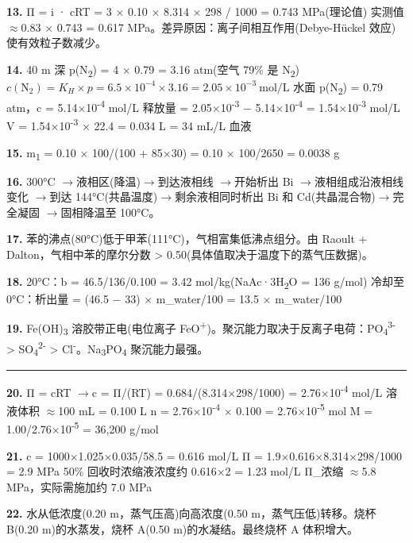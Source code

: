 \documentclass[a4paper,11pt]{ctexart}
\newcommand{\箭}{\ensuremath{\rightarrow}}
\newcommand{\左箭}{\ensuremath{\leftarrow}}
\newcommand{\上箭}{\ensuremath{\uparrow}}
\newcommand{\下箭}{\ensuremath{\downarrow}}
\newcommand{\衡}{\ensuremath{\rightleftharpoons}}
\newcommand{\双箭}{\ensuremath{\leftrightarrow}}
\newcommand{\约等于}{\ensuremath{\approx}}
\newcommand{\小于等于}{\ensuremath{\leq}}
\newcommand{\大于等于}{\ensuremath{\geq}}
\newcommand{\不等于}{\ensuremath{\neq}}
\newcommand{\西格马}{\ensuremath{\sigma}}
\newcommand{\派}{\ensuremath{\pi}}
\begin{document}
\textbf{13.} Π = i · cRT = 3 × 0.10 × 8.314 × 298 / 1000 = 0.743 MPa(理论值)
实测值 \约等于 0.83 × 0.743 = 0.617 MPa。差异原因：离子间相互作用(Debye-Hückel 效应)使有效粒子数减少。

\textbf{14.} 40 m 深 p(N\textsubscript{2}) = 4 × 0.79 = 3.16 atm(空气 79\% 是 N\textsubscript{2})
\(c(\mathrm{N_2}) = K_H \times p = 6.5 \times 10^{-4} \times 3.16 = 2.05 \times 10^{-3}\ \mathrm{mol/L}\)
水面 p(N\textsubscript{2}) = 0.79 atm，c = 5.14×10\textsuperscript{-4} mol/L
释放量 = 2.05×10\textsuperscript{-3} − 5.14×10\textsuperscript{-4} = 1.54×10\textsuperscript{-3} mol/L
V = 1.54×10\textsuperscript{-3} × 22.4 = 0.034 L = 34 mL/L 血液

\textbf{15.} m\textsubscript{1} = 0.10 × 100/(100 + 85×30) = 0.10 × 100/2650 = 0.0038 g

\textbf{16.} 300°C \箭 液相区(降温)\箭 到达液相线 \箭 开始析出 Bi \箭 液相组成沿液相线变化 \箭 到达 144°C(共晶温度)\箭 剩余液相同时析出 Bi 和 Cd(共晶混合物)\箭 完全凝固 \箭 固相降温至 100°C。

\textbf{17.} 苯的沸点(80°C)低于甲苯(111°C)，气相富集低沸点组分。由 Raoult + Dalton，气相中苯的摩尔分数 \textgreater{} 0.50(具体值取决于温度下的蒸气压数据)。

\textbf{18.} 20°C：b = 46.5/136/0.100 = 3.42 mol/kg(NaAc·3H\textsubscript{2}O = 136 g/mol)
冷却至 0°C：析出量 = (46.5 − 33) × m\_water/100 = 13.5 × m\_water/100

\textbf{19.} Fe(OH)\textsubscript{3} 溶胶带正电(电位离子 FeO\textsuperscript{+})。聚沉能力取决于反离子电荷：PO\textsubscript{4}\textsuperscript{3-} \textgreater{} SO\textsubscript{4}\textsuperscript{2-} \textgreater{} Cl\textsuperscript{-}。Na\textsubscript{3}PO\textsubscript{4} 聚沉能力最强。

\begin{center}\rule{0.5\linewidth}{0.5pt}\end{center}

\textbf{20.} Π = cRT \箭 c = Π/(RT) = 0.684/(8.314×298/1000) = 2.76×10\textsuperscript{-4} mol/L
溶液体积 \约等于 100 mL = 0.100 L
n = 2.76×10\textsuperscript{-4} × 0.100 = 2.76×10\textsuperscript{-5} mol
M = 1.00/2.76×10\textsuperscript{-5} = 36,200 g/mol

\textbf{21.} c = 1000×1.025×0.035/58.5 = 0.616 mol/L
Π = 1.9×0.616×8.314×298/1000 = 2.9 MPa
50\% 回收时浓缩液浓度约 0.616×2 = 1.23 mol/L
Π\_浓缩 \约等于 5.8 MPa，实际需施加约 7.0 MPa

\textbf{22.} 水从低浓度(0.20 m，蒸气压高)向高浓度(0.50 m，蒸气压低)转移。烧杯 B(0.20 m)的水蒸发，烧杯 A(0.50 m)的水凝结。最终烧杯 A 体积增大。
\end{document}
